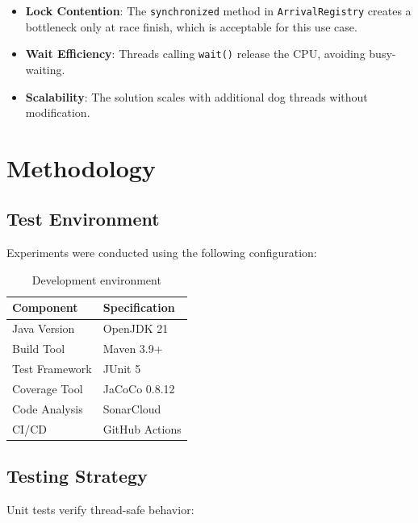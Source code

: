 \documentclass[10pt,a4paper,twocolumn]{article}
\begin{document}
\begin{itemize}
    \item \textbf{Lock Contention}: The \texttt{synchronized} method in \texttt{ArrivalRegistry} creates a bottleneck only at race finish, which is acceptable for this use case.
    \item \textbf{Wait Efficiency}: Threads calling \texttt{wait()} release the CPU, avoiding busy-waiting.
    \item \textbf{Scalability}: The solution scales with additional dog threads without modification.
\end{itemize}

\section{Methodology}

\subsection{Test Environment}

Experiments were conducted using the following configuration:

\begin{table}[H]
    \centering
    \begin{tabular}{|l|l|}
        \hline
        \textbf{Component} & \textbf{Specification} \\
        \hline
        Java Version & OpenJDK 21 \\
        \hline
        Build Tool & Maven 3.9+ \\
        \hline
        Test Framework & JUnit 5 \\
        \hline
        Coverage Tool & JaCoCo 0.8.12 \\
        \hline
        Code Analysis & SonarCloud \\
        \hline
        CI/CD & GitHub Actions \\
        \hline
    \end{tabular}
    \caption{Development environment}
    \label{tab:env}
\end{table}

\subsection{Testing Strategy}

Unit tests verify thread-safe behavior:
\end{document}
